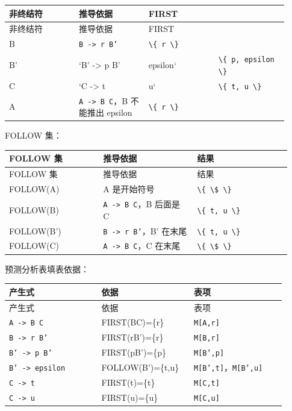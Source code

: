 \documentclass[UTF8]{ctexart}
\begin{document}
\begin{longtable}{|p{0.23\linewidth}|p{0.23\linewidth}|p{0.23\linewidth}|p{0.23\linewidth}|}
\hline
非终结符 & 推导依据 & FIRST &  \\
\hline
\endfirsthead
非终结符 & 推导依据 & FIRST &  \\
\hline
\endhead
B & \texttt{B -> r B'} & \texttt{\textbackslash{}\{ r \textbackslash{}\}} &  \\
\hline
B' & `B' -> p B' & epsilon` & \texttt{\textbackslash{}\{ p, epsilon \textbackslash{}\}} \\
\hline
C & `C -> t & u` & \texttt{\textbackslash{}\{ t, u \textbackslash{}\}} \\
\hline
A & \texttt{A -> B C}，B 不能推出 epsilon & \texttt{\textbackslash{}\{ r \textbackslash{}\}} &  \\
\hline
\end{longtable}

FOLLOW 集：

\begin{longtable}{|p{0.31\linewidth}|p{0.31\linewidth}|p{0.31\linewidth}|}
\hline
FOLLOW 集 & 推导依据 & 结果 \\
\hline
\endfirsthead
FOLLOW 集 & 推导依据 & 结果 \\
\hline
\endhead
FOLLOW(A) & A 是开始符号 & \texttt{\textbackslash{}\{ \textbackslash{}\$ \textbackslash{}\}} \\
\hline
FOLLOW(B) & \texttt{A -> B C}，B 后面是 C & \texttt{\textbackslash{}\{ t, u \textbackslash{}\}} \\
\hline
FOLLOW(B') & \texttt{B -> r B'}，B' 在末尾 & \texttt{\textbackslash{}\{ t, u \textbackslash{}\}} \\
\hline
FOLLOW(C) & \texttt{A -> B C}，C 在末尾 & \texttt{\textbackslash{}\{ \textbackslash{}\$ \textbackslash{}\}} \\
\hline
\end{longtable}

预测分析表填表依据：

\begin{longtable}{|p{0.31\linewidth}|p{0.31\linewidth}|p{0.31\linewidth}|}
\hline
产生式 & 依据 & 表项 \\
\hline
\endfirsthead
产生式 & 依据 & 表项 \\
\hline
\endhead
\texttt{A -> B C} & FIRST(BC)=\{r\} & \texttt{M[A,r]} \\
\hline
\texttt{B -> r B'} & FIRST(rB')=\{r\} & \texttt{M[B,r]} \\
\hline
\texttt{B' -> p B'} & FIRST(pB')=\{p\} & \texttt{M[B',p]} \\
\hline
\texttt{B' -> epsilon} & FOLLOW(B')=\{t,u\} & \texttt{M[B',t]}，\texttt{M[B',u]} \\
\hline
\texttt{C -> t} & FIRST(t)=\{t\} & \texttt{M[C,t]} \\
\hline
\texttt{C -> u} & FIRST(u)=\{u\} & \texttt{M[C,u]} \\
\hline
\end{longtable}
\end{document}
